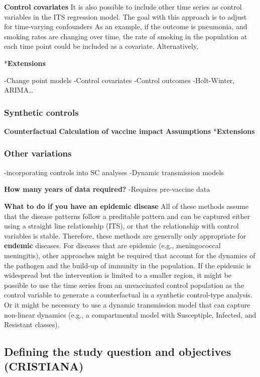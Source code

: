 \documentclass[]{article}
\begin{document}
\textbf{Control covariates} It is also possible to include other time
series as control variables in the ITS regression model. The goal with
this approach is to adjust for time-varying confounders As an example,
if the outcome is pneumonia, and smoking rates are changing over time,
the rate of smoking in the population at each time point could be
included as a covariate. Alternatively,

*\textbf{Extensions}

-Change point models -Control covariates -Control outcomes -Holt-Winter,
ARIMA\ldots{}

\subsubsection{Synthetic controls}\label{synthetic-controls}

\textbf{Counterfactual} \textbf{Calculation of vaccine impact}
\textbf{Assumptions} *\textbf{Extensions}

\subsubsection{Other variations}\label{other-variations}

-incorporating controls into SC analyses -Dynamic transmission models

\textbf{How many years of data required?} -Requires pre-vaccine data

\textbf{What to do if you have an epidemic disease} All of these methods
assume that the disease patterns follow a preditable pattern and can be
captured either using a straight line relationship (ITS), or that the
relationship with control variables is stable. Therefore, these methods
are generally only appropriate for \textbf{endemic} diseases. For
diseases that are epidemic (e.g., meningococcal meningitis), other
approaches might be required that account for the dynamics of the
pathogen and the build-up of immunity in the population. If the epidemic
is widespread but the intervention is limited to a smaller region, it
might be possible to use the time series from an unvaccinated control
population as the control variable to generate a counterfactual in a
synthetic control-type analysis. Or it might be necessary to use a
dynamic transmission model that can capture non-linear dynamics (e.g., a
compartmental model with Susceptiple, Infected, and Resistant classes).

\subsection{Defining the study question and objectives
(CRISTIANA)}\label{defining-the-study-question-and-objectives-cristiana}
\end{document}
